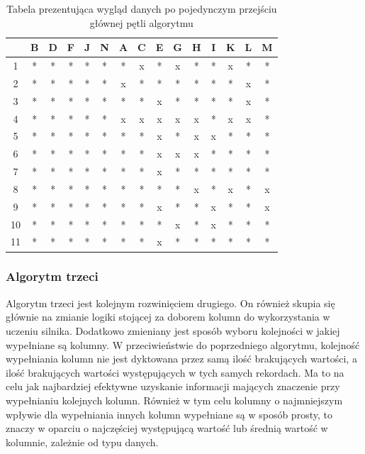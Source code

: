 \documentclass[12pt,twoside]{article}
\begin{document}
\begin{enumerate}[label=\arabic*), leftmargin=1.25cm]
          \begin{table}[ht]
              \caption{Tabela prezentująca wygląd danych po pojedynczym przejściu głównej pętli algorytmu}
              \centering
              \begin{tabular}{|c|c|c|c|c|c|c|c|c|c|c|c|c|c|c|}
                  \hline
                     & B & D & F & J & N & A & C & E & G & H & I & K & L & M \\ \hline
                  1  & * & * & * & * & * & * & x & * & x & * & * & x & * & * \\ \hline
                  2  & * & * & * & * & * & x & * & * & * & * & * & * & x & * \\ \hline
                  3  & * & * & * & * & * & * & * & x & * & * & * & * & x & * \\ \hline
                  4  & * & * & * & * & * & x & x & x & x & x & * & x & x & * \\ \hline
                  5  & * & * & * & * & * & * & * & x & * & x & x & * & * & * \\ \hline
                  6  & * & * & * & * & * & * & * & x & x & x & * & * & * & * \\ \hline
                  7  & * & * & * & * & * & * & * & x & * & * & * & * & * & * \\ \hline
                  8  & * & * & * & * & * & * & * & * & * & x & * & x & * & x \\ \hline
                  9  & * & * & * & * & * & * & * & x & * & * & x & * & * & x \\ \hline
                  10 & * & * & * & * & * & * & * & * & x & * & x & * & * & * \\ \hline
                  11 & * & * & * & * & * & * & * & x & * & * & * & * & * & * \\ \hline
              \end{tabular}
              \label{tab:2_end}
          \end{table}
          \FloatBarrier

\end{enumerate}
\subsubsection{Algorytm trzeci}

Algorytm trzeci jest kolejnym rozwinięciem drugiego. On również skupia się głównie na zmianie logiki
stojącej za doborem kolumn do wykorzystania w uczeniu silnika.
Dodatkowo zmieniany jest sposób wyboru kolejności w jakiej wypełniane są kolumny.
W przeciwieństwie do poprzedniego algorytmu, kolejność wypełniania kolumn nie jest dyktowana przez samą ilość
brakujących wartości, a ilość brakujących wartości występujących w tych samych rekordach.
Ma to na celu jak najbardziej efektywne uzyskanie informacji mających znaczenie przy wypełnianiu kolejnych kolumn.
Również w tym celu kolumny o najmniejszym wpływie dla wypełniania innych kolumn wypełniane są w sposób prosty,
to znaczy w oparciu o najczęściej występującą wartość lub średnią wartość w kolumnie, zależnie od typu danych.
\end{document}
